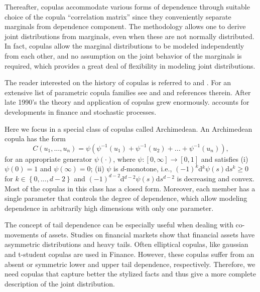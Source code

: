 \documentclass[a4paper,12pt]{report}
\begin{document}
Thereafter, copulas accommodate various forms of dependence through suitable choice of the copula ``correlation matrix'' since they conveniently separate marginals from dependence component. The methodology allows one to derive joint distributions from marginals, even when these are not normally distributed. In fact, copulas allow the marginal distributions to be modeled independently from each other, and no assumption on the joint behavior of the marginals is required, which provides a great deal of flexibility in modeling joint distributions.

\bigskip

The reader interested on the history of copulas is referred to \citet*{%
	schweizer2011} and \citet*{nelsen06}. For an extensive list of parametric
copula families see \citet*{joe97} and \citet*{nelsen06} and references
therein. After late 1990's the theory and application of copulas grew
enormously. \citet*{cherubini04} accounts for developments in finance and
stochastic processes.

Here we focus in a special class of copulas called Archimedean. An
Archimedean copula has the form
\begin{equation}
C\left( u_{1},...,u_{n}\right) =\psi \left( \psi ^{-1}\left( u_{1}\right)
+\psi ^{-1}\left( u_{2}\right) +...+\psi ^{-1}\left( u_{n}\right) \right) ,
\end{equation}%
for an appropriate generator $\psi \left( \cdot \right) $, where $\psi :%
\left[ 0,\infty \right] \rightarrow \left[ 0,1\right] $ and satisfies (i) $%
\psi (0)=1$ and $\psi (\infty )=0$; (ii) $\psi $ is $d$-monotone, i.e., $%
(-1)^{k}$d$^{k}\psi \left( s\right) $d$s^{k}\geq 0$ for $k\in \left\{
0,...,d-2\right\} $ and $(-1)^{d-2}$d$^{d-2}\psi \left( s\right) $d$s^{d-2}$
is decreasing and convex. Most of the copulas in this class has a closed
form. Moreover, each member has a single parameter that controls the degree
of dependence, which allow modeling dependence in arbitrarily high
dimensions with only one parameter.

The concept of tail dependence can be especially useful when dealing with
co-movements of assets. Studies on financial markets show that financial
assets have asymmetric distributions and heavy tails. Often elliptical
copulas, like gaussian and t-student copulas are used in Finance. However,
these copulas suffer from an absent or symmetric lower and upper tail
dependence, respectively. Therefore, we need copulas that capture better the
stylized facts and thus give a more complete description of the joint
distribution.
\end{document}
